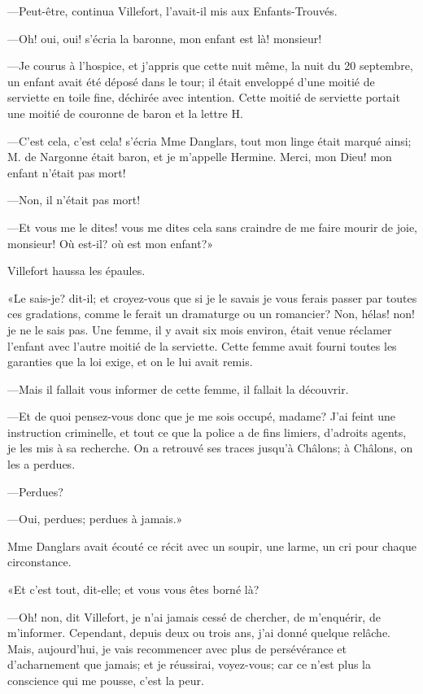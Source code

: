 —Peut-être, continua Villefort, l'avait-il mis aux Enfants-Trouvés. 

—Oh! oui, oui! s'écria la baronne, mon enfant est là! monsieur! 

—Je courus à l'hospice, et j'appris que cette nuit même, la nuit du 20 septembre, un enfant avait été déposé dans le tour; il était enveloppé d'une moitié de serviette en toile fine, déchirée avec intention. Cette moitié de serviette portait une moitié de couronne de baron et la lettre H. 

—C'est cela, c'est cela! s'écria Mme Danglars, tout mon linge était marqué ainsi; M. de Nargonne était baron, et je m'appelle Hermine. Merci, mon Dieu! mon enfant n'était pas mort! 

—Non, il n'était pas mort! 

—Et vous me le dites! vous me dites cela sans craindre de me faire mourir de joie, monsieur! Où est-il? où est mon enfant?» 

Villefort haussa les épaules. 

«Le sais-je? dit-il; et croyez-vous que si je le savais je vous ferais passer par toutes ces gradations, comme le ferait un dramaturge ou un romancier? Non, hélas! non! je ne le sais pas. Une femme, il y avait six mois environ, était venue réclamer l'enfant avec l'autre moitié de la serviette. Cette femme avait fourni toutes les garanties que la loi exige, et on le lui avait remis. 

—Mais il fallait vous informer de cette femme, il fallait la découvrir. 

—Et de quoi pensez-vous donc que je me sois occupé, madame? J'ai feint une instruction criminelle, et tout ce que la police a de fins limiers, d'adroits agents, je les mis à sa recherche. On a retrouvé ses traces jusqu'à Châlons; à Châlons, on les a perdues. 

—Perdues? 

—Oui, perdues; perdues à jamais.» 

Mme Danglars avait écouté ce récit avec un soupir, une larme, un cri pour chaque circonstance. 

«Et c'est tout, dit-elle; et vous vous êtes borné là? 

—Oh! non, dit Villefort, je n'ai jamais cessé de chercher, de m'enquérir, de m'informer. Cependant, depuis deux ou trois ans, j'ai donné quelque relâche. Mais, aujourd'hui, je vais recommencer avec plus de persévérance et d'acharnement que jamais; et je réussirai, voyez-vous; car ce n'est plus la conscience qui me pousse, c'est la peur. 

